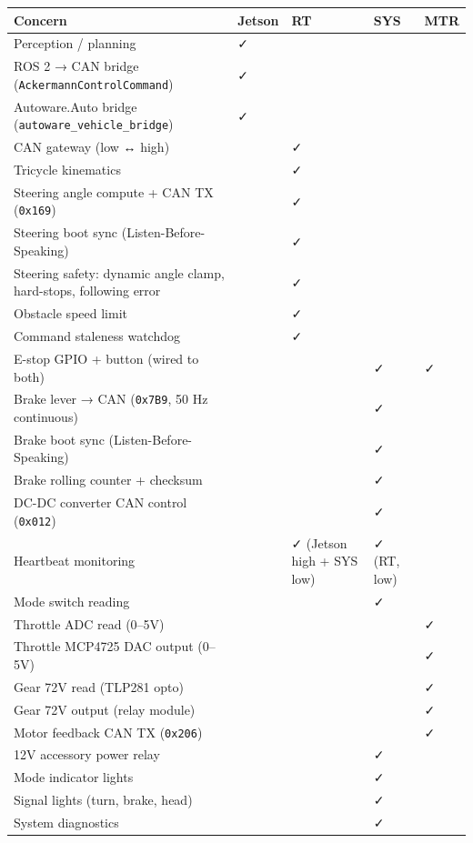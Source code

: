 \begin{longtable}[]{@{}lllll@{}}
\toprule\noalign{}
Concern & Jetson & RT & SYS & MTR \\
\midrule\noalign{}
\endhead
\bottomrule\noalign{}
\endlastfoot
Perception / planning & ✓ & & & \\
ROS 2 → CAN bridge (\texttt{AckermannControlCommand}) & ✓ & & & \\
Autoware.Auto bridge (\texttt{autoware\_vehicle\_bridge}) & ✓ & & & \\
CAN gateway (low ↔ high) & & ✓ & & \\
Tricycle kinematics & & ✓ & & \\
Steering angle compute + CAN TX (\texttt{0x169}) & & ✓ & & \\
Steering boot sync (Listen-Before-Speaking) & & ✓ & & \\
Steering safety: dynamic angle clamp, hard-stops, following error & & ✓ & & \\
Obstacle speed limit & & ✓ & & \\
Command staleness watchdog & & ✓ & & \\
E-stop GPIO + button (wired to both) & & & ✓ & ✓ \\
Brake lever → CAN (\texttt{0x7B9}, 50 Hz continuous) & & & ✓ & \\
Brake boot sync (Listen-Before-Speaking) & & & ✓ & \\
Brake rolling counter + checksum & & & ✓ & \\
DC-DC converter CAN control (\texttt{0x012}) & & & ✓ & \\
Heartbeat monitoring & & ✓ (Jetson high + SYS low) & ✓ (RT, low) & \\
Mode switch reading & & & ✓ & \\
Throttle ADC read (0--5V) & & & & ✓ \\
Throttle MCP4725 DAC output (0--5V) & & & & ✓ \\
Gear 72V read (TLP281 opto) & & & & ✓ \\
Gear 72V output (relay module) & & & & ✓ \\
Motor feedback CAN TX (\texttt{0x206}) & & & & ✓ \\
12V accessory power relay & & & ✓ & \\
Mode indicator lights & & & ✓ & \\
Signal lights (turn, brake, head) & & & ✓ & \\
System diagnostics & & & ✓ & \\
\end{longtable}

